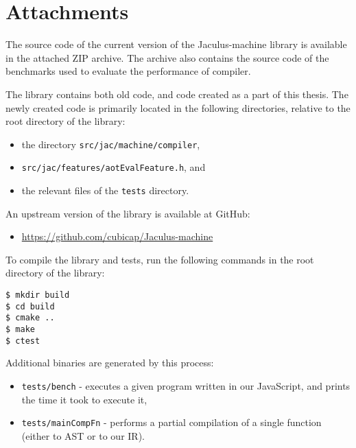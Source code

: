 \chapter{Attachments}\label{app:attachments}

The source code of the current version of the Jaculus-machine library is available in the attached ZIP archive. The archive also contains the source code of the benchmarks used to evaluate the performance of compiler.

The library contains both old code, and code created as a part of this thesis. The newly created code is primarily located in the following directories, relative to the root directory of the library:
\begin{itemize}
    \item the directory \texttt{src/jac/machine/compiler},
    \item \texttt{src/jac/features/aotEvalFeature.h}, and
    \item the relevant files of the \texttt{tests} directory.
\end{itemize}

\noindent
An upstream version of the library is available at GitHub:
\begin{itemize}
    \item \url{https://github.com/cubicap/Jaculus-machine}
\end{itemize}

\noindent
To compile the library and tests, run the following commands in the root directory of the library:
\begin{verbatim}
$ mkdir build
$ cd build
$ cmake ..
$ make
$ ctest
\end{verbatim}

\noindent
Additional binaries are generated by this process:
\begin{itemize}
    \item \texttt{tests/bench} - executes a given program written in our JavaScript, and prints the time it took to execute it,
    \item \texttt{tests/mainCompFn} - performs a partial compilation of a single function (either to AST or to our IR).
\end{itemize}
